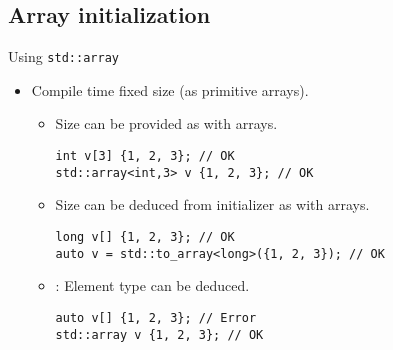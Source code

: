 \subsection{Array initialization}

\begin{frame}[t,fragile]{Using \texttt{std::array}}
  \begin{itemize}
    \item Compile time fixed size (as primitive arrays).
      \begin{itemize}
        \item Size can be provided as with arrays.
\begin{lstlisting}
int v[3] {1, 2, 3}; // OK
std::array<int,3> v {1, 2, 3}; // OK
\end{lstlisting}

        \item Size can be deduced from initializer as with arrays.
\begin{lstlisting}
long v[] {1, 2, 3}; // OK
auto v = std::to_array<long>({1, 2, 3}); // OK
\end{lstlisting}

        \item {}: Element type can be deduced.
\begin{lstlisting}
auto v[] {1, 2, 3}; // Error
std::array v {1, 2, 3}; // OK
\end{lstlisting}
      \end{itemize}

  \end{itemize}
\end{frame}


